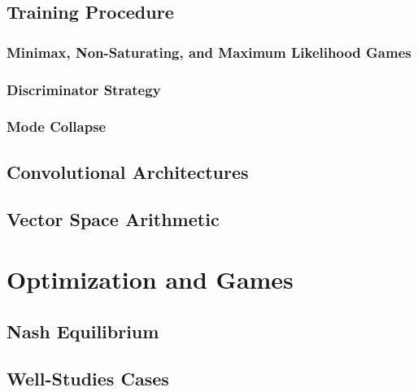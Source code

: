 		\subsection{Training Procedure} %

			\subsubsection{Minimax, Non-Saturating, and Maximum Likelihood Games} %

			\subsubsection{Discriminator Strategy} %

			\subsubsection{Mode Collapse} %

		\subsection{Convolutional Architectures} %

		\subsection{Vector Space Arithmetic} %

	\section{Optimization and Games} %

		\subsection{Nash Equilibrium} %

		\subsection{Well-Studies Cases} %

